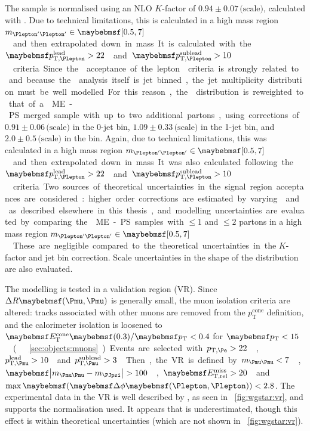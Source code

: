 The \sherpa sample is normalised using an NLO $K$-factor of $0.94\pm0.07\,\text{(scale)}$, 
calculated with \mcfm. Due to technical limitations, this is calculated in a high mass 
region \unit{$m_{\HepProcess{\Plepton'\Plepton'}} \in \hardrange{0.5,7}$}{\GeV} and then 
extrapolated down in mass. It is calculated with the \unit{$\ptleadlep > 22$}{\GeV} and 
\unit{$\ptsubleadlep > 10$}{\GeV} criteria.

Since the \Wgstar acceptance of the lepton \pt criteria is strongly related to \njets and 
because the \HWW analysis itself is jet binned, the jet multiplicity distribution must be 
well modelled. For this reason, the \njets distribution is reweighted to that of a \sherpa 
ME-PS merged sample with up to two additional partons, using corrections of 
$0.91\pm0.06\,\text{(scale)}$ in the 0-jet bin, $1.09\pm0.33\,\text{(scale)}$ in the 1-jet 
bin, and $2.0\pm0.5\,\text{(scale)}$ in the \twojet bin. Again, due to technical 
limitations, this was calculated in a high mass region 
\unit{$m_{\HepProcess{\Plepton'\Plepton'}} \in \hardrange{0.5,7}$}{\GeV} and then 
extrapolated down in mass. It was also calculated following the 
\unit{$\ptleadlep > 22$}{\GeV} and \unit{$\ptsubleadlep > 10$}{\GeV} criteria.

Two sources of theoretical uncertainties in the signal region acceptances are considered: 
higher order corrections are estimated by varying \mur and \muf as described elsewhere in 
this thesis, and modelling uncertainties are evaluated by comparing the \sherpa ME-PS 
samples with $\leq\!1$ and $\leq\!2$ partons in a high mass region 
\unit{$m_{\HepProcess{\Plepton'\Plepton'}} \in \hardrange{0.5,7}$}{\GeV}. These are 
negligible compared to the theoretical uncertainties in the $K$-factor and jet bin 
correction. Scale uncertainties in the shape of the \mt distribution are also evaluated.

The \Wgstar modelling is tested in a \HepProcess{\Wgstar \HepTo \Pe\Pnu\Pmu\Pmu} validation 
region (VR). Since $\Delta R\parenths{\Pmu,\Pmu}$ is generally small, the muon isolation 
criteria are altered: tracks associated with other muons are removed from the 
$p_{\text{T}}^{\text{cone}}$ definition, and the calorimeter isolation is loosened to 
$\etcone{0.3}/\pt < 0.4$ for \unit{$\pt < 15$}{\GeV} (\cf \Section~\ref{sec:objects:muons}).
Events are selected with \unit{$p_{\text{T,\Pe}} > 22$}{\GeV}, 
\unit{$p_{\text{T,\Pmu}}^{\text{lead}} > 10$}{\GeV} and 
\unit{$p_{\text{T,\Pmu}}^{\text{sublead}} > 3$}{\GeV}. 
Then, the VR is defined by \unit{$m_{\HepProcess{\Pmu\Pmu}} < 7$}{\GeV}, 
\unit{$\mods{m_{\HepProcess{\Pmu\Pmu}} - m_{\PJpsi}} > 100$}{\MeV}, 
\unit{$\calometrel > 20$}{\GeV} and $\max\parenths{\dphill} < 2.8$.
The experimental data in the VR is well described by \sherpa, as seen in 
\Figure~\ref{fig:wgstar:vr}, and supports the normalisation used. It appears that \njets is 
underestimated, though this effect is within theoretical uncertainties (which are not shown 
in \Figure~\ref{fig:wgstar:vr}).

